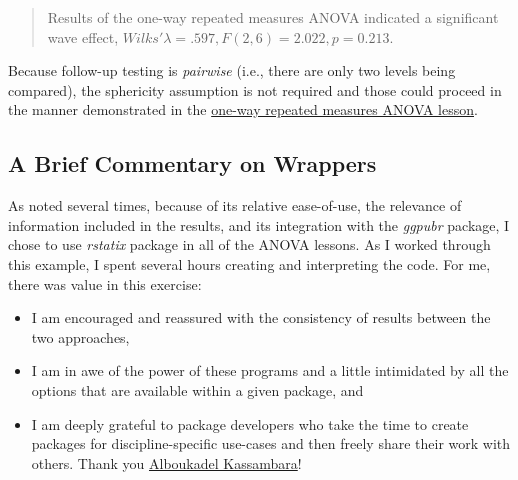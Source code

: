\documentclass[
  11pt,
]{book}
\providecommand{\tightlist}{%
  \setlength{\itemsep}{0pt}\setlength{\parskip}{0pt}}
\begin{document}
\begin{quote}
Results of the one-way repeated measures ANOVA indicated a significant wave effect, \(Wilks' \lambda = .597, F(2,6) = 2.022, p = 0.213\).
\end{quote}

Because follow-up testing is \emph{pairwise} (i.e., there are only two levels being compared), the sphericity assumption is not required and those could proceed in the manner demonstrated in the \protect\hyperlink{Repeated}{one-way repeated measures ANOVA lesson}.

\hypertarget{a-brief-commentary-on-wrappers}{%
\subsection{A Brief Commentary on Wrappers}\label{a-brief-commentary-on-wrappers}}

As noted several times, because of its relative ease-of-use, the relevance of information included in the results, and its integration with the \emph{ggpubr} package, I chose to use \emph{rstatix} package in all of the ANOVA lessons. As I worked through this example, I spent several hours creating and interpreting the code. For me, there was value in this exercise:

\begin{itemize}
\tightlist
\item
  I am encouraged and reassured with the consistency of results between the two approaches,
\item
  I am in awe of the power of these programs and a little intimidated by all the options that are available within a given package, and
\item
  I am deeply grateful to package developers who take the time to create packages for discipline-specific use-cases and then freely share their work with others. Thank you \href{https://github.com/kassambara/rstatix}{Alboukadel Kassambara}!
\end{itemize}

  
\end{document}
